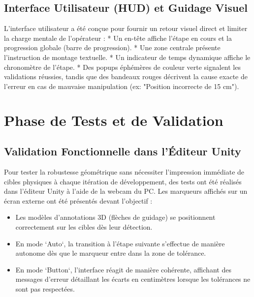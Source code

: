 \documentclass[12pt,a4paper]{article}
\begin{document}
\subsection{Interface Utilisateur (HUD) et Guidage Visuel}
L'interface utilisateur a été conçue pour fournir un retour visuel direct et limiter la charge mentale de l'opérateur :
* Un en-tête affiche l'étape en cours et la progression globale (barre de progression).
* Une zone centrale présente l'instruction de montage textuelle.
* Un indicateur de temps dynamique affiche le chronomètre de l'étape.
* Des popups éphémères de couleur verte signalent les validations réussies, tandis que des bandeaux rouges décrivent la cause exacte de l'erreur en cas de mauvaise manipulation (ex: "Position incorrecte de 15 cm").

\section{Phase de Tests et de Validation}

\subsection{Validation Fonctionnelle dans l'Éditeur Unity}
Pour tester la robustesse géométrique sans nécessiter l'impression immédiate de cibles physiques à chaque itération de développement, des tests ont été réalisés dans l'éditeur Unity à l'aide de la webcam du PC. Les marqueurs affichés sur un écran externe ont été présentés devant l'objectif :
\begin{itemize}
    \item Les modèles d'annotations 3D (flèches de guidage) se positionnent correctement sur les cibles dès leur détection.
    \item En mode `Auto`, la transition à l'étape suivante s'effectue de manière autonome dès que le marqueur entre dans la zone de tolérance.
    \item En mode `Button`, l'interface réagit de manière cohérente, affichant des messages d'erreur détaillant les écarts en centimètres lorsque les tolérances ne sont pas respectées.
\end{itemize}
\end{document}
